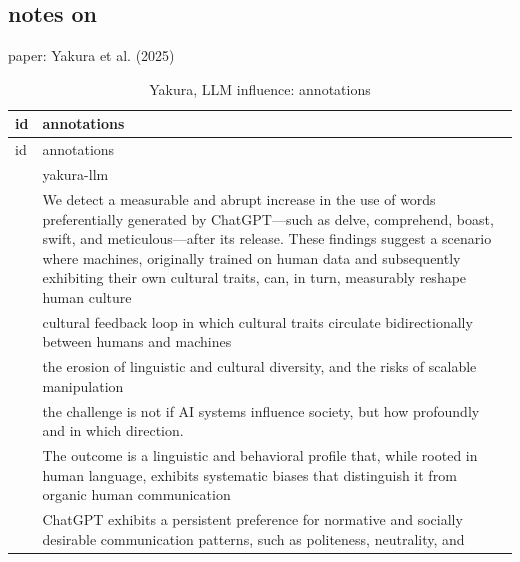 \documentclass[
  letterpaper,
  DIV=11,
  numbers=noendperiod]{scrartcl}
\begin{document}
\subsection{notes on}\label{notes-on-1}

paper: Yakura et al. (2025)

\begin{longtable}[]{@{}
  >{\raggedleft\arraybackslash}p{}
  >{\raggedright\arraybackslash}p{}@{}}
\caption{Yakura, LLM influence: annotations}\tabularnewline
\toprule\noalign{}
\begin{minipage}[b]{\linewidth}\raggedleft
id
\end{minipage} & \begin{minipage}[b]{\linewidth}\raggedright
annotations
\end{minipage} \\
\midrule\noalign{}
\endfirsthead
\toprule\noalign{}
\begin{minipage}[b]{\linewidth}\raggedleft
id
\end{minipage} & \begin{minipage}[b]{\linewidth}\raggedright
annotations
\end{minipage} \\
\midrule\noalign{}
\endhead
\bottomrule\noalign{}
\endlastfoot
76 & yakura-llm \\
77 & We detect a measurable and abrupt increase in the use of words
preferentially generated by ChatGPT---such as delve, comprehend, boast,
swift, and meticulous---after its release. These findings suggest a
scenario where machines, originally trained on human data and
subsequently exhibiting their own cultural traits, can, in turn,
measurably reshape human culture \\
78 & cultural feedback loop in which cultural traits circulate
bidirectionally between humans and machines \\
79 & the erosion of linguistic and cultural diversity, and the risks of
scalable manipulation \\
80 & the challenge is not if AI systems influence society, but how
profoundly and in which direction. \\
81 & The outcome is a linguistic and behavioral profile that, while
rooted in human language, exhibits systematic biases that distinguish it
from organic human communication \\
82 & ChatGPT exhibits a persistent preference for normative and socially
desirable communication patterns, such as politeness, neutrality, and

\end{longtable}
\end{document}
